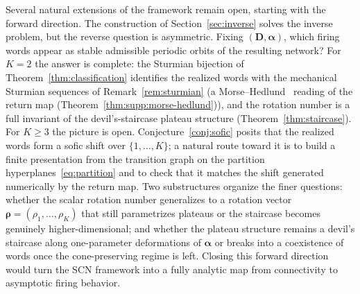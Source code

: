 \documentclass[12pt]{article}
\newcommand{\vv}[1]{\mathbf{#1}}
\begin{document}
Several natural extensions of the framework remain open, starting with the forward direction. The construction of Section~\ref{sec:inverse} solves the inverse problem, but the reverse question is asymmetric. Fixing $(\vv{D},\boldsymbol{\alpha})$, which firing words appear as stable admissible periodic orbits of the resulting network? For $K=2$ the answer is complete: the Sturmian bijection of Theorem~\ref{thm:classification} identifies the realized words with the mechanical Sturmian sequences of Remark~\ref{rem:sturmian} (a Morse--Hedlund~\citep{morse1938symbolic,morse1940symbolic} reading of the return map (Theorem~\ref{thm:supp:morse-hedlund})), and the rotation number is a full invariant of the devil's-staircase plateau structure (Theorem~\ref{thm:staircase}). For $K\geq 3$ the picture is open. Conjecture~\ref{conj:sofic} posits that the realized words form a sofic shift over $\{1,\ldots,K\}$; a natural route toward it is to build a finite presentation from the transition graph on the partition hyperplanes~\eqref{eq:partition} and to check that it matches the shift generated numerically by the return map. Two substructures organize the finer questions: whether the scalar rotation number generalizes to a rotation vector $\boldsymbol{\rho}=(\rho_1,\ldots,\rho_K)$ that still parametrizes plateaus or the staircase becomes genuinely higher-dimensional; and whether the plateau structure remains a devil's staircase along one-parameter deformations of $\boldsymbol{\alpha}$ or breaks into a coexistence of words once the cone-preserving regime is left. Closing this forward direction would turn the SCN framework into a fully analytic map from connectivity to asymptotic firing behavior.
\end{document}
